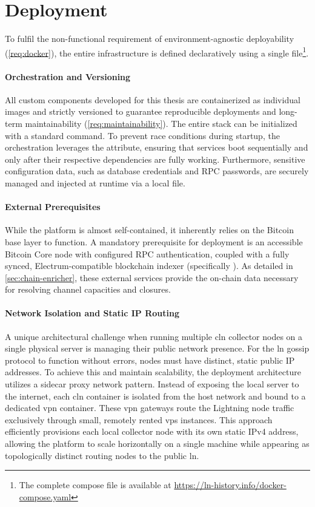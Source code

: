 \section{Deployment}
\label{sec:deployment}

To fulfil the non-functional requirement of environment-agnostic deployability (\ref{req:docker}), 
the entire  infrastructure is defined declaratively using a single 
 file\footnote{The complete compose file is available at \url{https://ln-history.info/docker-compose.yaml}}.

\paragraph{Orchestration and Versioning}
All custom components developed for this thesis are containerized as individual  images 
and strictly versioned to guarantee reproducible deployments and long-term maintainability (\ref{req:maintainability}).
The entire stack can be initialized with a standard  command. 
To prevent race conditions during startup, the orchestration leverages the  attribute, 
ensuring that services boot sequentially and only after their respective dependencies are fully working. 
Furthermore, sensitive configuration data, such as database credentials and RPC passwords, 
are securely managed and injected at runtime via a local  file.

\paragraph{External Prerequisites}
While the  platform is almost self-contained, 
it inherently relies on the Bitcoin base layer to function. 
A mandatory prerequisite for deployment is an accessible Bitcoin Core node with configured RPC authentication,
coupled with a fully synced, Electrum-compatible blockchain indexer (specifically ). 
As detailed in \autoref{sec:chain-enricher}, these external services provide the on-chain data necessary for resolving channel capacities and closures.

\paragraph{Network Isolation and Static IP Routing}
A unique architectural challenge when running multiple \gls{cln} collector nodes on a single physical server 
is managing their public network presence.
For the \gls{ln} gossip protocol to function without errors, nodes must have distinct, static public IP addresses. 
To achieve this and maintain scalability, the deployment architecture utilizes a sidecar proxy network pattern. 
Instead of exposing the local server to the internet, each \gls{cln} container is isolated 
from the host network and bound to a dedicated  \gls{vpn} container. 
These \gls{vpn} gateways route the Lightning node traffic exclusively through small, remotely rented \gls{vps} instances. 
This approach efficiently provisions each local collector node with its own static IPv4 address, allowing the platform
to scale horizontally on a single machine while appearing as topologically distinct routing nodes to the public \gls{ln}.